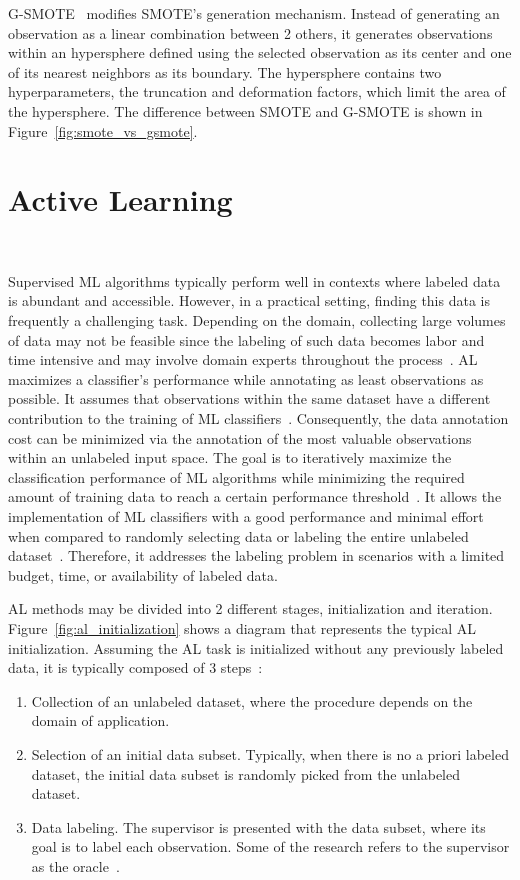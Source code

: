 G-SMOTE~\cite{Douzas2019} modifies SMOTE's generation mechanism. Instead of
generating an observation as a linear combination between 2 others, it
generates observations within an hypersphere defined using the selected
observation as its center and one of its nearest neighbors as its boundary.
The hypersphere contains two hyperparameters, the truncation and deformation
factors, which limit the area of the hypersphere. The difference between SMOTE
and G-SMOTE is shown in Figure~\ref{fig:smote_vs_gsmote}.

\section{Active Learning}~\label{sec:active_learning}

Supervised ML algorithms typically perform well in contexts where labeled data
is abundant and accessible. However, in a practical setting, finding this data
is frequently a challenging task. Depending on the domain, collecting large
volumes of data may not be feasible since the labeling of such data becomes
labor and time intensive and may involve domain experts throughout the
process~\cite{Cao2020}. AL maximizes a classifier's performance while
annotating as least observations as possible. It assumes that observations
within the same dataset have a different contribution to the training of ML
classifiers~\cite{Ren2021}. Consequently, the data annotation cost can be
minimized via the annotation of the most valuable observations within an
unlabeled input space. The goal is to iteratively maximize the classification
performance of ML algorithms while minimizing the required amount of training
data to reach a certain performance threshold~\cite{Shrivastava2021}. It
allows the implementation of ML classifiers with a good performance and
minimal effort when compared to randomly selecting data or labeling the entire
unlabeled dataset~\cite{Ren2020}. Therefore, it addresses the labeling problem
in scenarios with a limited budget, time, or availability of labeled data. 

AL methods may be divided into 2 different stages, initialization and
iteration. Figure~\ref{fig:al_initialization} shows a diagram that represents
the typical AL initialization. Assuming the AL task is initialized without any
previously labeled data, it is typically composed of 3
steps~\cite{Fonseca2021}: 

\begin{enumerate}
    \item Collection of an unlabeled dataset, where the procedure depends on
        the domain of application.
    \item Selection of an initial data subset. Typically, when there is no a
        priori labeled dataset, the initial data subset is randomly picked
        from the unlabeled dataset.
    \item Data labeling. The supervisor is presented with the data subset,
        where its goal is to label each observation. Some of the research
        refers to the supervisor as the oracle~\cite{Yoo2019, Aghdam2019}.
\end{enumerate}

